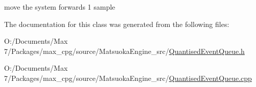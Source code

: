 move the system forwards 1 sample 



The documentation for this class was generated from the following files\+:\begin{DoxyCompactItemize}
\item 
O\+:/\+Documents/\+Max 7/\+Packages/max\+\_\+cpg/source/\+Matsuoka\+Engine\+\_\+src/\mbox{\hyperlink{QuantisedEventQueue_8h}{Quantised\+Event\+Queue.\+h}}\item 
O\+:/\+Documents/\+Max 7/\+Packages/max\+\_\+cpg/source/\+Matsuoka\+Engine\+\_\+src/\mbox{\hyperlink{QuantisedEventQueue_8cpp}{Quantised\+Event\+Queue.\+cpp}}\end{DoxyCompactItemize}
